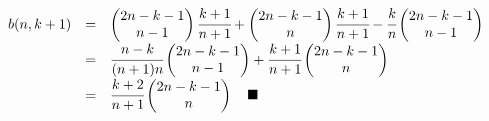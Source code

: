 \[
	\begin{array}{l l l}
		b(n,k+1) & = & \begin{pmatrix} 2n-k-1\\n-1\end{pmatrix}\cfrac{k+1}{n+1}+\begin{pmatrix} 2n-k-1\\n\end{pmatrix}\cfrac{k+1}{n+1}-\cfrac{k}{n}\begin{pmatrix} 2n-k-1\\n-1\end{pmatrix} \\
		         & = & \cfrac{n-k}{(n+1)n}\begin{pmatrix} 2n-k-1\\n-1\end{pmatrix}+\cfrac{k+1}{n+1}\begin{pmatrix} 2n-k-1\\n\end{pmatrix}                                                   \\
		         & = & \cfrac{k+2}{n+1}\begin{pmatrix} 2n-k-1\\n\end{pmatrix} \hspace{10pt} \blacksquare                                                                                    \\
	\end{array}\vspace{10pt}
\]


